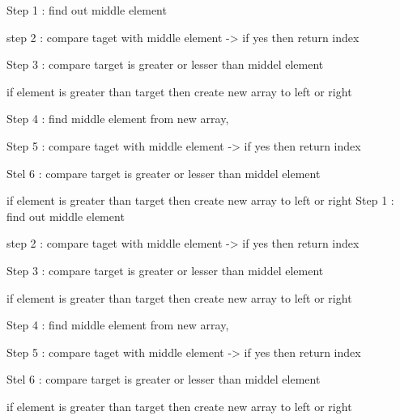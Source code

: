 Step 1  : find out middle element  

step 2 : compare taget with middle element  -> if yes then return index 

Step 3 : compare target is greater or lesser than middel element 

        if element is greater than target then create new array to left or right 

Step 4 : find middle element from new array, 

Step 5 : compare taget with middle element  -> if yes then return index 

Stel 6 : compare target is greater or lesser than middel element 

if element is greater than target then create new array to left or right Step 1  : find out middle element  

step 2 : compare taget with middle element  -> if yes then return index 

Step 3 : compare target is greater or lesser than middel element 

        if element is greater than target then create new array to left or right 

Step 4 : find middle element from new array, 

Step 5 : compare taget with middle element  -> if yes then return index 

Stel 6 : compare target is greater or lesser than middel element 

if element is greater than target then create new array to left or right 